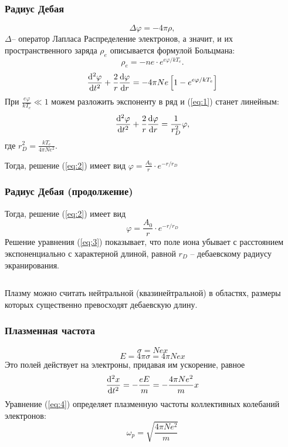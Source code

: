 \documentclass[10pt,pdf,hyperref={unicode}, dvipsnames]{beamer}
\renewcommand{\phi}{\varphi}
\begin{document}
\begin{frame}[t]\frametitle{Радиус Дебая}
\begin{equation}
	\Delta\phi= -4\pi\rho,
\end{equation}
$\Delta$-- оператор Лапласа
Распределение электронов,
а значит, и их пространственного заряда
$\rho_e$ описывается формулой Больцмана:
\begin{equation}
	\rho_e= -ne\cdot e^{e\phi/kT_e}.
\end{equation}
\begin{equation}
	\label{eq:1}
	\dv[2]{\phi}{t}+\frac2r\dv{\phi}{r}=-4\pi Ne\left[1 -e^{e\phi/kT_e}\right]
\end{equation}
При $\displaystyle \frac{e\phi}{kT_e}\ll1$ можем разложить экспоненту в ряд и (\ref{eq:1}) станет линейным:
\begin{equation}
	\label{eq:2}
	\dv[2]{\phi}{t}+\frac2r\dv{\phi}{r}=\frac{1}{r_D^2}\phi,
\end{equation}
где $\displaystyle r_D^2=\frac{kT_e}{4\pi Ne^2}$.

Тогда, решение (\ref{eq:2}) имеет вид $\displaystyle \phi=\frac{A_0}{r}\cdot e^{-r/r_D}$
\end{frame}
\begin{frame}[t]\frametitle{Радиус Дебая (продолжение)}
	Тогда, решение (\ref{eq:2}) имеет вид 
	\begin{equation}
		\label{eq:3}
		\phi=\frac{A_0}{r}\cdot e^{-r/r_D}
	\end{equation}  
    Решение уравнения (\ref{eq:3}) показывает, что поле иона убывает с расстоянием экспоненциально с характерной длиной, равной $r_D$ -- дебаевскому радиусу экранирования. 

    $$\,$$

    Плазму можно считать нейтральной (квазинейтральной) в областях, размеры которых существенно превосходят дебаевскую длину.
\end{frame}
\begin{frame}[t]\frametitle{Плазменная частота}
\begin{equation}
	\sigma = Nex
\end{equation}
\begin{equation}
	E=4\pi\sigma=4\pi Nex
\end{equation}
Это полей действует на электроны, придавая им ускорение, равное
\begin{equation}
	\label{eq:4}
	\dv[2]{x}{t}=-\frac{eE}{m}=-\frac{4\pi N e^2}{m}x
\end{equation}
Уравнение (\ref{eq:4}) определяет плазменную частоты коллективных колебаний электронов:
\begin{equation}
	\omega_p=\sqrt{\frac{4\pi N e^2}{m}}
\end{equation}



\end{frame}
\end{document}
